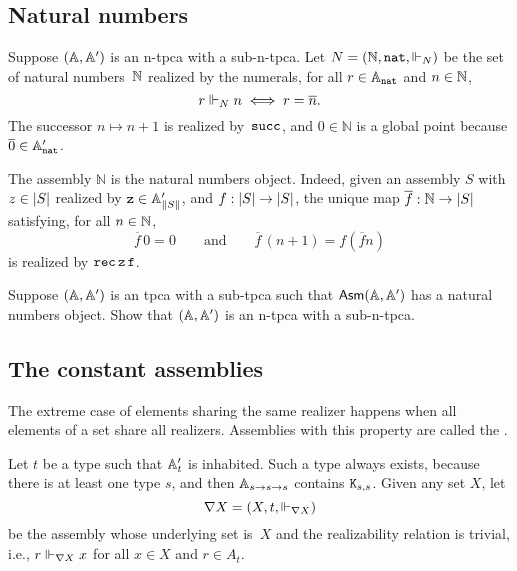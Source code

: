 \subsection{Natural numbers}
\label{sec:asm-natural-numbers}

Suppose $(\AA, \subAA)$ is an n-tpca with a sub-n-tpca. Let $N = (\NN, \ttnat, {\rz[N]})$ be the set of natural numbers~$\NN$ realized by the numerals, for all $r \in \Atyp{\ttnat}$ and $n \in \NN$,
%
\begin{equation*}
  r \rz[N] n \iff
  r = \overline{n}.
\end{equation*}
%
The successor $n \mapsto n + 1$ is realized by~$\combSucc$, and $0 \in \mathbb{N}$ is a global point because $\numeral{0} \in \subAtyp{\ttnat}$.

The assembly $\mathbb{N}$ is the natural numbers object. Indeed, given an assembly $S$ with $z \in \S{S}$ realized by $\mathtt{z} \in \subAtyp{\T{S}}$, and $f : \S{S} \to \S{S}$, the unique map $\overline{f} : \mathbb{N} \to \S{S}$ satisfying, for all $n \in \NN$,
%
\begin{equation*}
  \overline{f} \, 0 = 0
  \qquad\text{and}\qquad
  \overline{f} \, (n + 1) = f (\overline{f} n)
\end{equation*}
%
is realized by $\combRec \, \mathtt{z} \, \mathtt{f}$.

\begin{exercise}
  Suppose $(\AA, \subAA)$ is an tpca with a sub-tpca such that $\AsmA$ has a natural numbers object. Show that $(\AA, \subAA)$ is an n-tpca with a sub-n-tpca.
\end{exercise}


\subsection{The constant assemblies}
\label{sec:nabla}

The extreme case of elements sharing the same realizer happens when
all elements of a set share all realizers. Assemblies with this
property are called the .

Let $t$ be a type such that $\subAtyp{t}$ is inhabited. Such a type
always exists, because there is at least one type $s$, and then
$\Atyp{s \to s \to s}$ contains $\combK_{s,s}$. Given any set $X$, let
%
\begin{equation*}
  \nabla X = (X, t, {\rz[\nabla X]})
\end{equation*}
%
be the assembly whose underlying set is~$X$ and the realizability relation is trivial, i.e., $r \rz[\nabla X] x$ for all $x \in X$ and $r \in A_t$.

